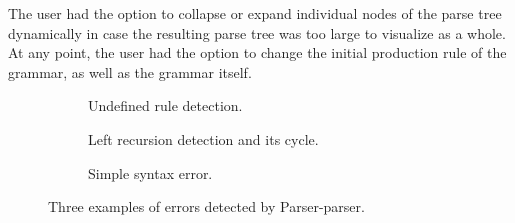 \documentclass[english,bachelors,forcepolishlogotype]{wizthesis}
\newcommand{\thisproject}{Parser-parser}
\begin{document}
The user had the option to collapse or expand individual nodes of the parse tree
dynamically in case the resulting parse tree was too large to visualize as a
whole. At any point, the user had the option to change the initial production
rule of the grammar, as well as the grammar itself.

\begin{figure}[H]
  \centering
  \begin{subfigure}[b]{0.49\textwidth}
    \centering
    \caption{Undefined rule detection.}
    \label{fig:undefined-rule-detection}
  \end{subfigure}
  \hfill
  \begin{subfigure}[b]{0.49\textwidth}
    \centering
    \caption{Left recursion detection and its cycle.}
    \label{fig:left-recursion-detection}
  \end{subfigure}
  \hfill
  \begin{subfigure}[b]{0.49\textwidth}
    \centering
    \caption{Simple syntax error.}
    \label{fig:simple-syntax-error}
  \end{subfigure}
  \caption{Three examples of errors detected by \thisproject{}.}
  \label{fig:parser-parser-error-examples}
\end{figure}
\end{document}
